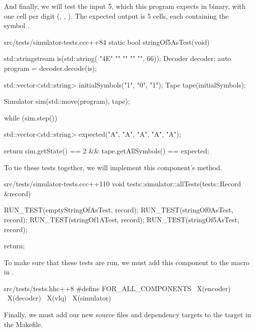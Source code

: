 And finally, we will test the input 5, which this program expects in binary, with one cell per digit (, , ). The expected output is 5 cells, each containing the symbol .

\begin{file}{src/tests/simulator-tests.cc}{c++}{84}
static bool stringOf5AsTest(void)
{
    std::stringstream is(std::string(
        "\x4E"
        ""
        ""
        ""
        "",
        66));
    Decoder decoder;
    auto program = decoder.decode(is);

    std::vector<std::string> initialSymbols({"1", "0", "1"});
    Tape tape(initialSymbols);

    Simulator sim(std::move(program), tape);

    while (sim.step())
    {
    }

    std::vector<std::string> expected({"A", "A", "A", "A", "A"});

    return sim.getState() == 2 && tape.getAllSymbols() == expected;
}
\end{file}

To tie these tests together, we will implement this component's  method.

\begin{file}{src/tests/simulator-tests.cc}{c++}{110}
void tests::simulator::allTests(tests::Record &record)
{
    RUN_TEST(emptyStringOfAsTest, record);
    RUN_TEST(stringOf0AsTest, record);
    RUN_TEST(stringOf1ATest, record);
    RUN_TEST(stringOf5AsTest, record);

    return;
}
\end{file}

To make sure that these tests are run, we must add this component to the  macro in .

\begin{file}{src/tests/tests.hh}{c++}{8}
#define FOR_ALL_COMPONENTS \
    X(encoder)             \
    X(decoder)             \
    X(vlq)                 \
    X(simulator)
\end{file}

Finally, we must add our new source files and dependency targets to the  target in the Makefile.


